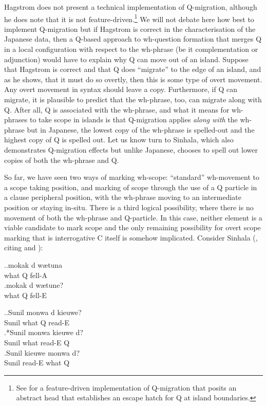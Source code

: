 \documentclass[charis]{glossa}
\begin{document}
Hagstrom does not present a technical implementation of Q-migration, although he does note that it is not feature-driven.\footnote{See \cite{yeo:2010} for a feature-driven implementation of Q-migration that posits an abstract head that establishes an escape hatch for Q at island boundaries.} We will not debate here how best to implement Q-migration but if Hagstrom is correct in the characterisation of the Japanese data, then a Q-based approach to wh-question formation that merges Q in a local configuration with respect to the wh-phrase (be it complementation or adjunction) would have to explain why Q can move out of an island. Suppose that Hagstrom is correct and that Q does ``migrate'' to the edge of an island, and as he shows, that it must do so overtly, then this is some type of overt movement. Any overt movement in syntax should leave a copy. Furthermore, if Q can migrate, it is plausible to predict that the wh-phrase, too, can migrate along with Q. After all, Q is associated with the wh-phrase, and what it means for wh-phrases to take scope in islands is that Q-migration applies \textit{along with} the wh-phrase but in Japanese, the lowest copy of the wh-phrase is spelled-out and the highest copy of Q is spelled out. Let us know turn to Sinhala, which also demonstrates Q-migration effects but unlike Japanese, chooses to spell out lower copies of both the wh-phrase and Q.


So far, we have seen two ways of marking wh-scope: ``standard'' wh-movement to a scope taking position, and marking of scope through the use of a Q particle in a clause peripheral position, with the wh-phrase moving to an intermediate position or staying in-situ. There is a third logical possibility, where there is no movement of both the wh-phrase and Q-particle. In this case, neither element is a viable candidate to mark scope and the only remaining possibility for overt scope marking that is interrogative C itself is somehow implicated. Consider Sinhala (\cite{slade:2011}, citing \cite{gair-sumangala:1991} and \cite{hagstrom:1998}):

\ex.\ag.\label{sso.30a}mokak d{\textschwa} w{\ae}tuna\\
   what Q fell-A\\
   \bg.\label{sso.30b}mokak d{\textschwa} w{\ae}tune?\\
   what Q fell-E\\

\ex.\label{sso.31}\ag.\label{sso.31a}Sunil mon{\textschwa}wa d{\textschwa} kieuwe?\\
      Sunil what Q read-E\\
   \bg.*\label{sso.31b}Sunil mon{\textschwa}wa kieuwe d{\textschwa}?\\
      Sunil what read-E Q\\
   \bg.\label{sso.31c}Sunil kieuwe mon{\textschwa}wa d{\textschwa}?\\
      Sunil read-E what Q \\
\end{document}
